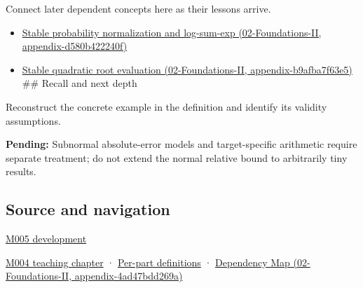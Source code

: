 Connect later dependent concepts here as their lessons arrive.

\begin{itemize}
\tightlist
\item
  \href{../02-Foundations-II/main.pdf\#nameddest=appendix-d580b422240f}{Stable probability normalization and log-sum-exp (02-Foundations-II, appendix-d580b422240f)}
\item
  \href{../02-Foundations-II/main.pdf\#nameddest=appendix-b9afba7f63e5}{Stable quadratic root evaluation (02-Foundations-II, appendix-b9afba7f63e5)} \#\# Recall and next depth
\end{itemize}

Reconstruct the concrete example in the definition and identify its validity assumptions.

\textbf{Pending:} Subnormal absolute-error models and target-specific arithmetic require separate treatment; do not extend the normal relative bound to arbitrarily tiny results.

\subsection{Source and navigation}\label{appendix-bc44f7b42f42-source-and-navigation}

\hyperref[01-foundations-i-ch001-when-arithmetic-meets-uncertainty]{M005 development}

\hyperref[01-foundations-i-ch001-a-stretching-ruler-for-real-valued-quantities]{M004 teaching chapter} · \hyperref[appendix-fd090d982a15-m004---parts-61-76]{Per-part definitions} · \href{../02-Foundations-II/main.pdf\#nameddest=appendix-4ad47bdd269a}{Dependency Map (02-Foundations-II, appendix-4ad47bdd269a)}
